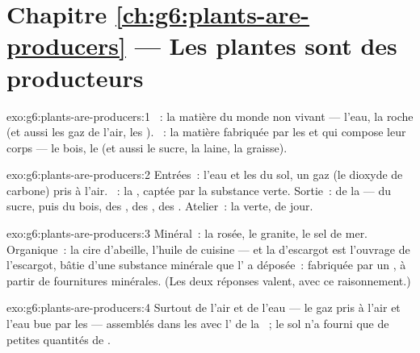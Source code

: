 \section*{Chapitre \ref{ch:g6:plants-are-producers} --- Les plantes sont des producteurs}

\begin{solution}{exo:g6:plants-are-producers:1}
~: la matière du monde non vivant --- l'eau, la
roche (et aussi les gaz de l'air, les ). ~: la matière fabriquée par les  et qui
compose leur corps --- le bois, le  (et aussi le sucre, la
laine, la graisse).
\end{solution}

\begin{solution}{exo:g6:plants-are-producers:2}
Entrées~: l'eau et les  du sol, un gaz (le dioxyde de
carbone) pris à l'air. ~: la , captée par la substance
verte. Sortie~: de la  --- du sucre, puis du bois,
des , des , des . Atelier~: la  verte,
de jour.
\end{solution}

\begin{solution}{exo:g6:plants-are-producers:3}
Minéral~: la rosée, le granite, le sel de mer. Organique~: la cire
d'abeille, l'huile de cuisine --- et la  d'escargot est
l'ouvrage de l'escargot, bâtie d'une substance minérale que l'
a déposée~: fabriquée par un , à partir de fournitures
minérales. (Les deux réponses valent, avec ce raisonnement.)
\end{solution}

\begin{solution}{exo:g6:plants-are-producers:4}
Surtout de l'air et de l'eau --- le gaz pris à l'air et l'eau bue
par les  --- assemblés dans les  avec l' de la
~; le sol n'a fourni que de petites quantités de .
\end{solution}


